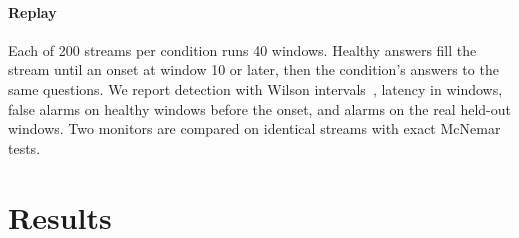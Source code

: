 \documentclass{article}
\begin{document}
\paragraph{Replay} Each of 200 streams per condition runs 40 windows. Healthy
answers fill the stream until an onset at window 10 or later, then the condition's
answers to the same questions. We report detection with Wilson
intervals~\citep{wilson1927probable}, latency in windows, false alarms on healthy
windows before the onset, and alarms on the real held-out windows. Two monitors
are compared on identical streams with exact McNemar tests.

\section{Results}
\label{sec:results}

\begin{table}[t]
  \centering\small
  \caption{The four monitors and the closest prior test on every study. Detection
  is the share of 200 streams alarmed after the onset (for local faults, the range
  over four faults); topic shift is the share of streams alarmed on the harder
  harmless shift; false alarms are per healthy window before the onset (budget
  0.1\%). Production answers per question in brackets. Real-traffic topic shifts
  use topics found without labels. The primary of five replays; Appendix~\ref{app:replays}
  gives the spread.}
  \label{tab:monitors}
  \setlength{\tabcolsep}{3.6pt}
\end{table}
\end{document}
